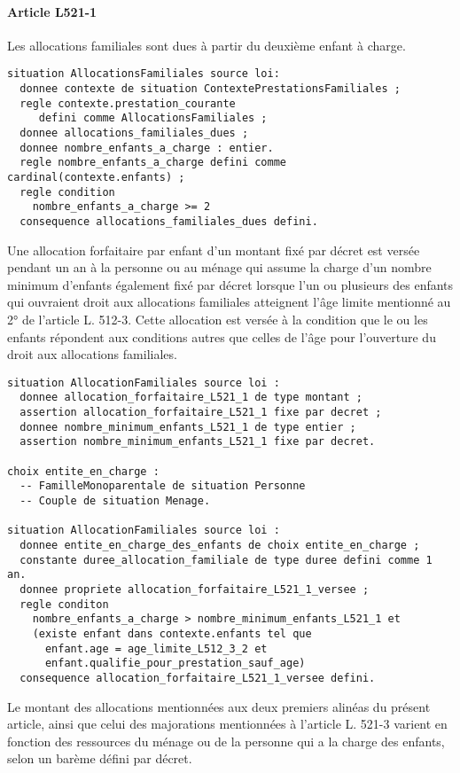 \documentclass[11pt, french]{article}
\begin{document}
\paragraph{Article L521-1} Les allocations familiales sont dues à partir du deuxième enfant à charge.
\begin{lstlisting}
situation AllocationsFamiliales source loi:
  donnee contexte de situation ContextePrestationsFamiliales ;
  regle contexte.prestation_courante
     defini comme AllocationsFamiliales ;
  donnee allocations_familiales_dues ;
  donnee nombre_enfants_a_charge : entier.
  regle nombre_enfants_a_charge defini comme cardinal(contexte.enfants) ;
  regle condition
    nombre_enfants_a_charge >= 2
  consequence allocations_familiales_dues defini.
\end{lstlisting}
Une allocation forfaitaire par enfant d'un montant fixé par décret est versée pendant un an à la personne ou au ménage qui assume la charge d'un nombre minimum d'enfants également fixé par décret lorsque l'un ou plusieurs des enfants qui ouvraient droit aux allocations familiales atteignent l'âge limite mentionné au 2° de l'article L. 512-3. Cette allocation est versée à la condition que le ou les enfants répondent aux conditions autres que celles de l'âge pour l'ouverture du droit aux allocations familiales.
\begin{lstlisting}
situation AllocationFamiliales source loi :
  donnee allocation_forfaitaire_L521_1 de type montant ;
  assertion allocation_forfaitaire_L521_1 fixe par decret ;
  donnee nombre_minimum_enfants_L521_1 de type entier ;
  assertion nombre_minimum_enfants_L521_1 fixe par decret.

choix entite_en_charge :
  -- FamilleMonoparentale de situation Personne
  -- Couple de situation Menage.

situation AllocationFamiliales source loi :
  donnee entite_en_charge_des_enfants de choix entite_en_charge ;
  constante duree_allocation_familiale de type duree defini comme 1 an.
  donnee propriete allocation_forfaitaire_L521_1_versee ;
  regle conditon
    nombre_enfants_a_charge > nombre_minimum_enfants_L521_1 et
    (existe enfant dans contexte.enfants tel que
      enfant.age = age_limite_L512_3_2 et
      enfant.qualifie_pour_prestation_sauf_age)
  consequence allocation_forfaitaire_L521_1_versee defini.
\end{lstlisting}
Le montant des allocations mentionnées aux deux premiers alinéas du présent article, ainsi que celui des majorations mentionnées à l'article L. 521-3 varient en fonction des ressources du ménage ou de la personne qui a la charge des enfants, selon un barème défini par décret.
\end{document}
